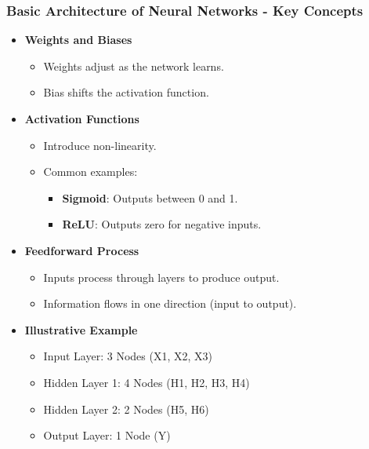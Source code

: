 \documentclass[aspectratio=169]{beamer}
\begin{document}
\begin{frame}[fragile]
    \frametitle{Basic Architecture of Neural Networks - Key Concepts}
    \begin{itemize}
        \item \textbf{Weights and Biases}
            \begin{itemize}
                \item Weights adjust as the network learns.
                \item Bias shifts the activation function.
            \end{itemize}
        
        \item \textbf{Activation Functions}
            \begin{itemize}
                \item Introduce non-linearity.
                \item Common examples: 
                \begin{itemize}
                    \item \textbf{Sigmoid}: Outputs between 0 and 1.
                    \item \textbf{ReLU}: Outputs zero for negative inputs.
                \end{itemize}
            \end{itemize}
        
        \item \textbf{Feedforward Process}
            \begin{itemize}
                \item Inputs process through layers to produce output.
                \item Information flows in one direction (input to output).
            \end{itemize}
        
        \item \textbf{Illustrative Example}
            \begin{itemize}
                \item Input Layer: 3 Nodes (X1, X2, X3)
                \item Hidden Layer 1: 4 Nodes (H1, H2, H3, H4)
                \item Hidden Layer 2: 2 Nodes (H5, H6)
                \item Output Layer: 1 Node (Y)
            \end{itemize}
    \end{itemize}
\end{frame}
\end{document}
